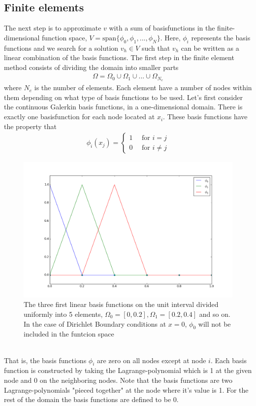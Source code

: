 \subsection{Finite elements}
The next step is to approximate $v$ with a sum of basisfunctions in the finite-dimensional function space, $V = \text{span}\{\phi_0, \phi_1, ..., \phi_N \}$. Here, $\phi_i$ represents the basis functions and we search for a solution $v_h \in V$ such that $v_h$ can be written as a linear combination of the basis functions. 
The first step in the finite element method consists of dividing the domain into smaller parts
\begin{align*}
\Omega = \Omega_0 \cup \Omega_1 \cup ... \cup \Omega_{N_e}
\end{align*}
where $N_e$ is the number of elements. Each element have a number of nodes within them depending on what type of basis functions to be used. Let's first consider the continuous Galerkin basis functions, in a one-dimensional domain. There is exactly one basisfunction for each node located at $x_i$. These basis functions have the property that
\begin{align*}
\phi_i(x_j) = \begin{cases}
				1 \quad \text{ for } i=j \\
				0 \quad \text{ for } i\neq j
		 		\end{cases}
\end{align*}
\begin{figure}[!ht]
  \begin{center}
    \includegraphics[scale=0.4]{figures/hats.png}
  \end{center}
	\caption{The three first linear basis functions on the unit interval divided uniformly into 5 elements, $\Omega_0 = [0,0.2], \Omega_1 = [0.2,0.4]$ and so on. In the case of Dirichlet Boundary conditions at $x=0$, $\phi_0$ will not be included in the funtcion space}
	\label{fig:Hats}
\end{figure}
\\
That is, the basis functions $\phi_i$ are zero on all nodes except at node $i$. Each basis function is constructed by taking the Lagrange-polynomial which is 1 at the given node and 0 on the neighboring nodes. Note that the basis functions are two Lagrange-polynomials "pieced together" at the node where it's value is 1. For the rest of the domain the basis functions are defined to be 0. \\ \\

